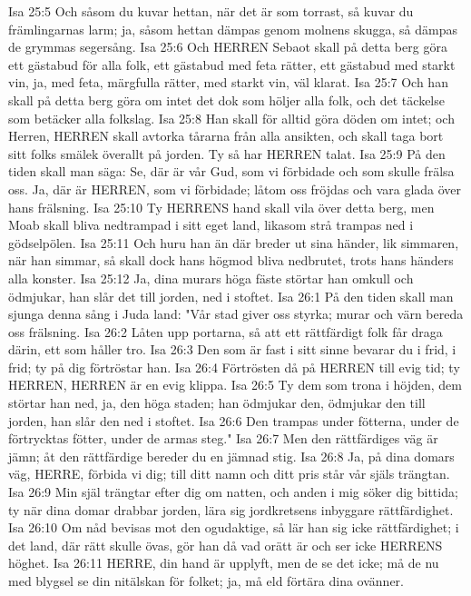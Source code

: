 Isa 25:5  Och såsom du kuvar hettan, när det är som torrast, så kuvar du främlingarnas larm; ja, såsom hettan dämpas genom molnens skugga, så dämpas de grymmas segersång.
Isa 25:6  Och HERREN Sebaot skall på detta berg göra ett gästabud för alla folk, ett gästabud med feta rätter, ett gästabud med starkt vin, ja, med feta, märgfulla rätter, med starkt vin, väl klarat.
Isa 25:7  Och han skall på detta berg göra om intet det dok som höljer alla folk, och det täckelse som betäcker alla folkslag.
Isa 25:8  Han skall för alltid göra döden om intet; och Herren, HERREN skall avtorka tårarna från alla ansikten, och skall taga bort sitt folks smälek överallt på jorden. Ty så har HERREN talat.
Isa 25:9  På den tiden skall man säga: Se, där är vår Gud, som vi förbidade och som skulle frälsa oss. Ja, där är HERREN, som vi förbidade; låtom oss fröjdas och vara glada över hans frälsning.
Isa 25:10  Ty HERRENS hand skall vila över detta berg, men Moab skall bliva nedtrampad i sitt eget land, likasom strå trampas ned i gödselpölen.
Isa 25:11  Och huru han än där breder ut sina händer, lik simmaren, när han simmar, så skall dock hans högmod bliva nedbrutet, trots hans händers alla konster.
Isa 25:12  Ja, dina murars höga fäste störtar han omkull och ödmjukar, han slår det till jorden, ned i stoftet.
Isa 26:1  På den tiden skall man sjunga denna sång i Juda land: "Vår stad giver oss styrka; murar och värn bereda oss frälsning.
Isa 26:2  Låten upp portarna, så att ett rättfärdigt folk får draga därin, ett som håller tro.
Isa 26:3  Den som är fast i sitt sinne bevarar du i frid, i frid; ty på dig förtröstar han.
Isa 26:4  Förtrösten då på HERREN till evig tid; ty HERREN, HERREN är en evig klippa.
Isa 26:5  Ty dem som trona i höjden, dem störtar han ned, ja, den höga staden; han ödmjukar den, ödmjukar den till jorden, han slår den ned i stoftet.
Isa 26:6  Den trampas under fötterna, under de förtrycktas fötter, under de armas steg."
Isa 26:7  Men den rättfärdiges väg är jämn; åt den rättfärdige bereder du en jämnad stig.
Isa 26:8  Ja, på dina domars väg, HERRE, förbida vi dig; till ditt namn och ditt pris står vår själs trängtan.
Isa 26:9  Min själ trängtar efter dig om natten, och anden i mig söker dig bittida; ty när dina domar drabbar jorden, lära sig jordkretsens inbyggare rättfärdighet.
Isa 26:10  Om nåd bevisas mot den ogudaktige, så lär han sig icke rättfärdighet; i det land, där rätt skulle övas, gör han då vad orätt är och ser icke HERRENS höghet.
Isa 26:11  HERRE, din hand är upplyft, men de se det icke; må de nu med blygsel se din nitälskan för folket; ja, må eld förtära dina ovänner.
